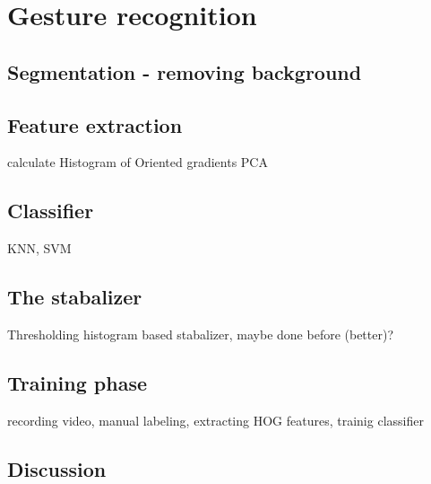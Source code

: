 \chapter{Gesture recognition}
\label{ch:gestures}


\section{Segmentation - removing background}

\section{Feature extraction}
calculate Histogram of Oriented gradients\cite{watanabe2009}
PCA

\section{Classifier}
KNN,  SVM

\section{The stabalizer}
Thresholding histogram based stabalizer, maybe done before (better)?

\section{Training phase}
recording video, manual labeling, extracting HOG features, trainig classifier

\section{Discussion}